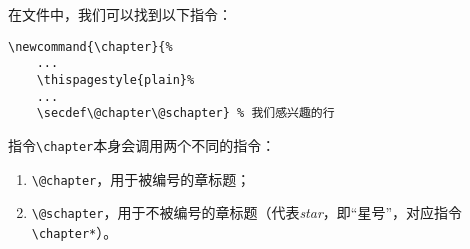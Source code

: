 在文件中，我们可以找到以下指令：

\begin{dmd}
\begin{verbatim}
\newcommand{\chapter}{% 
    ...
    \thispagestyle{plain}%
    ...
    \secdef\@chapter\@schapter} % 我们感兴趣的行
\end{verbatim}
\end{dmd}

指令\verb|\chapter|本身会调用两个不同的指令：

\begin{enumerate}
    \item \verb|\@chapter|，用于被编号的章标题；
    \item \verb|\@schapter|，用于不被编号的章标题（代表\emph{star}，即“星号”，对应指令\verb|\chapter*|）。
\end{enumerate}